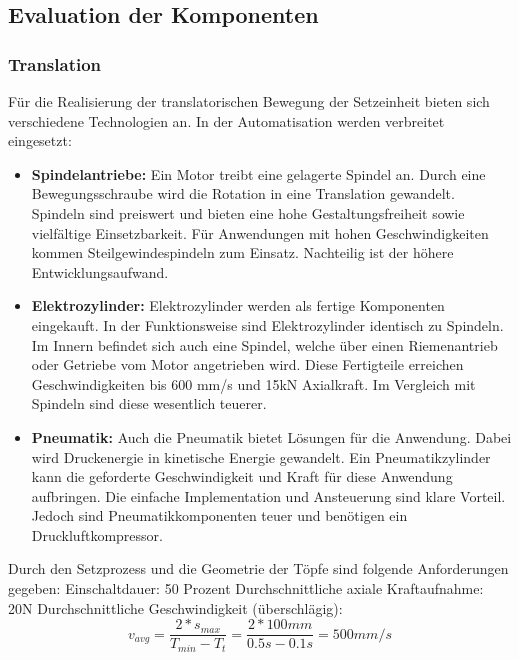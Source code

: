 \subsection{Evaluation der Komponenten}
\subsubsection{Translation}
 	\label{subsec:Translation}

Für die Realisierung der translatorischen Bewegung der Setzeinheit bieten sich verschiedene Technologien an. In der Automatisation werden verbreitet eingesetzt:
	\begin{itemize}
	\item \textbf{Spindelantriebe:}
	Ein Motor treibt eine gelagerte Spindel an. Durch eine Bewegungsschraube wird die Rotation in eine Translation gewandelt. Spindeln sind preiswert und bieten eine hohe Gestaltungsfreiheit sowie vielfältige Einsetzbarkeit. Für Anwendungen mit hohen Geschwindigkeiten kommen Steilgewindespindeln zum Einsatz. Nachteilig ist der höhere Entwicklungsaufwand.
	\item \textbf{Elektrozylinder:}
	Elektrozylinder werden als fertige Komponenten eingekauft. In der Funktionsweise sind Elektrozylinder identisch zu Spindeln. Im Innern befindet sich auch eine Spindel, welche über einen Riemenantrieb oder Getriebe vom Motor angetrieben wird. Diese Fertigteile erreichen Geschwindigkeiten bis 600 mm/s und 15kN Axialkraft. Im Vergleich mit Spindeln sind diese wesentlich teuerer.
	\item \textbf{Pneumatik:}
	Auch die Pneumatik bietet Lösungen für die Anwendung. Dabei wird Druckenergie in kinetische Energie gewandelt. Ein Pneumatikzylinder kann die geforderte Geschwindigkeit und Kraft für diese Anwendung aufbringen. Die einfache Implementation und Ansteuerung sind klare Vorteil. Jedoch sind Pneumatikkomponenten teuer und benötigen ein Druckluftkompressor.
	\end{itemize}

Durch den Setzprozess und die Geometrie der Töpfe sind folgende Anforderungen gegeben:
\newline
Einschaltdauer: 50 Prozent
\newline
Durchschnittliche axiale Kraftaufnahme: 20N
\newline
Durchschnittliche Geschwindigkeit (überschlägig):
\begin{equation}
v_{avg}=\frac{2*s_{max}}{T_{min}-T_{t}}=\frac{2*100mm}{0.5s-0.1s}=500mm/s
\end{equation}

